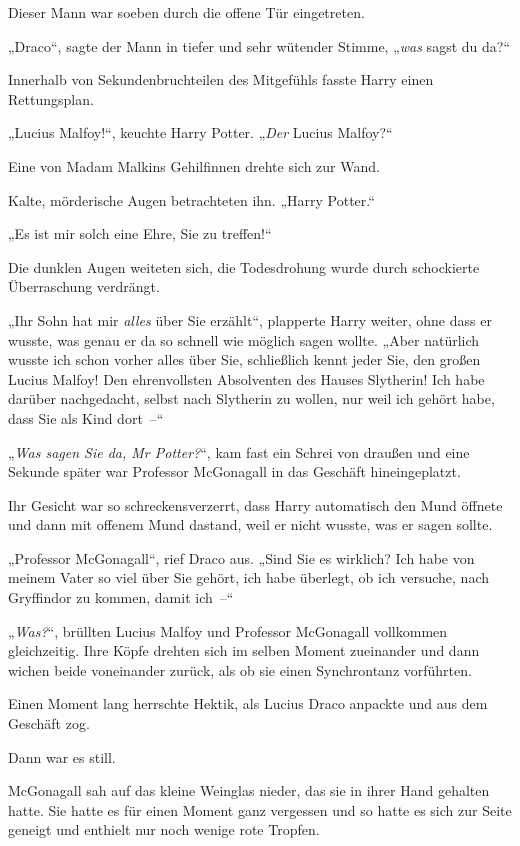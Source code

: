 {Dieser Mann war soeben durch die offene Tür eingetreten.

„Draco“, sagte der Mann in tiefer und sehr wütender Stimme, „\emph{was} sagst du da?“

Innerhalb von Sekundenbruchteilen des Mitgefühls fasste Harry einen Rettungsplan.

„Lucius Malfoy!“, keuchte Harry Potter. „\emph{Der} Lucius Malfoy?“

Eine von Madam Malkins Gehilfinnen drehte sich zur Wand.

Kalte, mörderische Augen betrachteten ihn. „Harry Potter.“

„Es ist mir solch eine Ehre, Sie zu treffen!“

Die dunklen Augen weiteten sich, die Todesdrohung wurde durch schockierte Überraschung verdrängt.

„Ihr Sohn hat mir \emph{alles} über Sie erzählt“, plapperte Harry weiter, ohne dass er wusste, was genau er da so schnell wie möglich sagen wollte. „Aber natürlich wusste ich schon vorher alles über Sie, schließlich kennt jeder Sie, den großen Lucius Malfoy! Den ehrenvollsten Absolventen des Hauses Slytherin! Ich habe darüber nachgedacht, selbst nach Slytherin zu wollen, nur weil ich gehört habe, dass Sie als Kind dort~--“

„\emph{Was sagen Sie da, Mr Potter?}“, kam fast ein Schrei von draußen und eine Sekunde später war Professor McGonagall in das Geschäft hineingeplatzt.

Ihr Gesicht war so schreckensverzerrt, dass Harry automatisch den Mund öffnete und dann mit offenem Mund dastand, weil er nicht wusste, was er sagen sollte.

„Professor McGonagall“, rief Draco aus. „Sind Sie es wirklich? Ich habe von meinem Vater so viel über Sie gehört, ich habe überlegt, ob ich versuche, nach Gryffindor zu kommen, damit ich~--“

„\emph{Was?}“, brüllten Lucius Malfoy und Professor McGonagall vollkommen gleichzeitig. Ihre Köpfe drehten sich im selben Moment zueinander und dann wichen beide voneinander zurück, als ob sie einen Synchrontanz vorführten.

Einen Moment lang herrschte Hektik, als Lucius Draco anpackte und aus dem Geschäft zog.

Dann war es still.

McGonagall sah auf das kleine Weinglas nieder, das sie in ihrer Hand gehalten hatte. Sie hatte es für einen Moment ganz vergessen und so hatte es sich zur Seite geneigt und enthielt nur noch wenige rote Tropfen.

}
